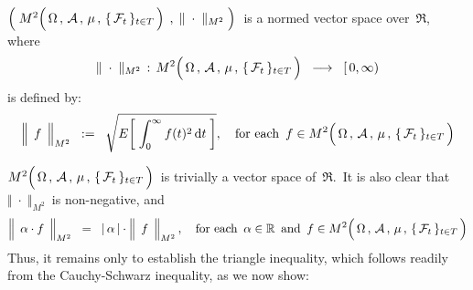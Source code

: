 \vskip 0.5cm
\begin{proposition}
\label{MTwoIsNormedVectorSpace}
\mbox{}
\vskip 0.2cm
\noindent
$\left(\;
	M^{2}\!
		\left(\,
			\overset{{\color{white}.}}{\Omega} \,,\, \mathcal{A} \,,\, \mu \,,\, \{\,\mathcal{F}_{t}\,\}_{t \in T}
			\,\right)
	\;,\;
	\Vert\;\cdot\;\Vert_{M^{2}}
	\;\right)$\,
is a normed vector space over \,$\Re$,\, where
\begin{equation*}
\Vert\;\cdot\;\Vert_{M^{2}} \,:\,
M^{2}\!
	\left(\,
		\overset{{\color{white}.}}{\Omega} \,,\, \mathcal{A} \,,\, \mu \,,\, \{\,\mathcal{F}_{t}\,\}_{t \in T}
		\,\right)
\;\; \longrightarrow \;\;
[\,0,\infty)
\end{equation*}
is defined by:
\begin{equation*}
\left\Vert\;\, \overset{{\color{white}}}{f} \,\;\right\Vert_{M^{2}}
\;\; := \;\;
	\sqrt{E\!\left[\;
		\int_{0}^{\infty} f(t)^{2} \,\d t
		\;\right]},
\quad
\textnormal{for each \,$f \in M^{2}\!
		\left(\,
			\overset{{\color{white}.}}{\Omega} \,,\, \mathcal{A} \,,\, \mu \,,\, \{\,\mathcal{F}_{t}\,\}_{t \in T}
			\,\right)$}
\end{equation*}
\end{proposition}
\proof
$M^{2}\!\left(\,
	\overset{{\color{white}.}}{\Omega} \,,\, \mathcal{A} \,,\, \mu \,,\, \{\,\mathcal{F}_{t}\,\}_{t \in T}
	\,\right)$\,
is trivially a vector space of \,$\Re$.\,
It is also clear that
\,$\Vert\;\cdot\;\Vert_{M^{2}}$\, is non-negative, and
\begin{equation*}
\left\Vert\;\, \alpha\cdot\overset{{\color{white}.}}{f} \,\;\right\Vert_{M^{2}}
\;\; = \;\;
	\vert\,\alpha\,\vert \cdot \left\Vert\;\, \overset{{\color{white}}}{f} \,\;\right\Vert_{M^{2}},
\quad
\textnormal{for each \,$\alpha \in \Re$\, and \,$f \in M^{2}\!\left(\,
	\overset{{\color{white}.}}{\Omega} \,,\, \mathcal{A} \,,\, \mu \,,\, \{\,\mathcal{F}_{t}\,\}_{t \in T}
	\,\right)$}
\end{equation*}
Thus, it remains only to establish the triangle inequality,
which follows readily from the Cauchy-Schwarz inequality, as we now show:
